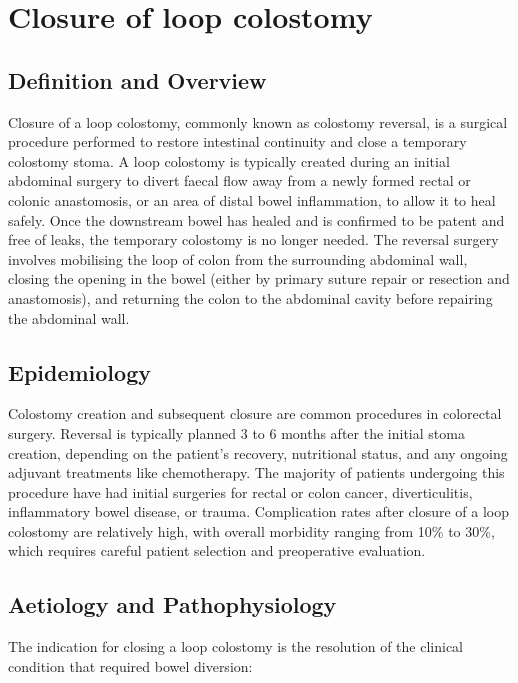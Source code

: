 \chapter{Closure of loop colostomy}

\section*{Definition and Overview}
Closure of a loop colostomy, commonly known as colostomy reversal, is a surgical procedure performed to restore intestinal continuity and close a temporary colostomy stoma. A loop colostomy is typically created during an initial abdominal surgery to divert faecal flow away from a newly formed rectal or colonic anastomosis, or an area of distal bowel inflammation, to allow it to heal safely. Once the downstream bowel has healed and is confirmed to be patent and free of leaks, the temporary colostomy is no longer needed. The reversal surgery involves mobilising the loop of colon from the surrounding abdominal wall, closing the opening in the bowel (either by primary suture repair or resection and anastomosis), and returning the colon to the abdominal cavity before repairing the abdominal wall.

\section*{Epidemiology}
Colostomy creation and subsequent closure are common procedures in colorectal surgery. Reversal is typically planned 3 to 6 months after the initial stoma creation, depending on the patient's recovery, nutritional status, and any ongoing adjuvant treatments like chemotherapy. The majority of patients undergoing this procedure have had initial surgeries for rectal or colon cancer, diverticulitis, inflammatory bowel disease, or trauma. Complication rates after closure of a loop colostomy are relatively high, with overall morbidity ranging from 10\% to 30\%, which requires careful patient selection and preoperative evaluation.

\section*{Aetiology and Pathophysiology}
The indication for closing a loop colostomy is the resolution of the clinical condition that required bowel diversion:

